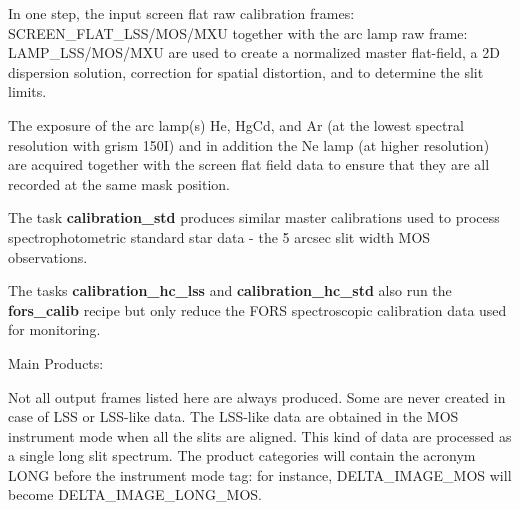 In one step, the input screen flat raw calibration frames: SCREEN\_FLAT\_LSS/MOS/MXU together with the arc lamp raw frame: LAMP\_LSS/MOS/MXU
are used to create a normalized master flat-field, a 2D dispersion solution, correction for spatial distortion, and to determine the slit limits.

The exposure of the arc lamp(s) He, HgCd, and Ar (at the lowest spectral resolution with grism 150I) and in addition the Ne lamp (at higher resolution) are acquired together with the screen flat field data to ensure that they are all recorded at the same mask position. 

The task {\bf calibration\_std} produces similar master calibrations used to process spectrophotometric standard star data - the 5 arcsec slit width MOS observations.

The tasks {\bf calibration\_hc\_lss} and {\bf calibration\_hc\_std} also run the {\bf fors\_calib} recipe but only reduce the FORS spectroscopic calibration data used for monitoring.


Main Products:

Not all output frames listed here are always produced. Some are never created in case of LSS or LSS-like data. The LSS-like data are obtained in the MOS instrument mode when all the slits are aligned. This kind of data are processed as a single
long slit spectrum. The product categories will contain the acronym LONG before the instrument mode tag: for instance, DELTA\_IMAGE\_MOS will become DELTA\_IMAGE\_LONG\_MOS.

